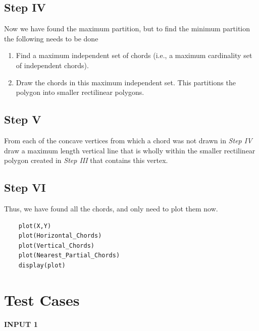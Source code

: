 \subsection{Step IV}

Now we have found the maximum partition, but to find the minimum partition the following needs to be done
\begin{enumerate}
  \item Find a maximum independent set of chords (i.e., a maximum cardinality set of independent chords).
  \item Draw the chords in this maximum independent set. This partitions the polygon into smaller rectilinear polygons.
\end{enumerate}
\pagebreak
\subsection{Step V}
From each of the concave vertices from which a chord was not drawn in \emph{Step IV} draw a maximum length vertical line that is wholly within the smaller rectilinear polygon created in \emph{Step III} that contains this vertex.


\subsection{Step VI}

Thus, we have found all the chords, and only need to plot them now.
\begin{lstlisting}
    plot(X,Y)
    plot(Horizontal_Chords)
    plot(Vertical_Chords)
    plot(Nearest_Partial_Chords)
    display(plot)
\end{lstlisting}
\pagebreak

\section {Test Cases}

\textbf{INPUT 1}

\begin{figure}[h]
  \centering
\end{figure}

